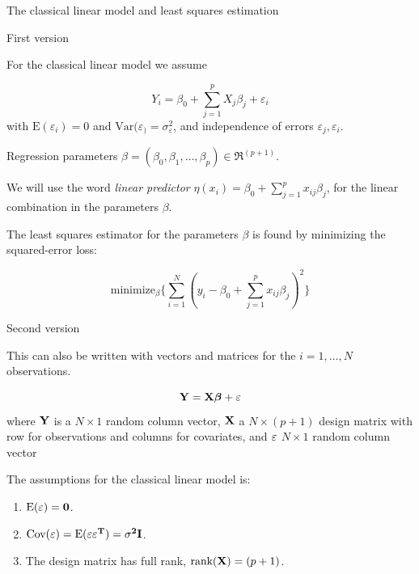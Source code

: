 \documentclass[
  ignorenonframetext,
]{beamer}
\begin{document}
\begin{frame}

\begin{block}{The classical linear model and least squares estimation}

\begin{block}{First version}

For the classical linear model we assume

\[ Y_i=\beta_0+\sum_{j=1}^p X_{j}\beta_j+\varepsilon_i\] with
\(\text{E}(\varepsilon_i)=0\) and
\(\text{Var}(\varepsilon_)=\sigma^2_{\varepsilon}\), and independence of
errors \(\varepsilon_j,\varepsilon_i\).

Regression parameters
\(\beta=(\beta_0,\beta_1,\ldots,\beta_p)\in \Re^{(p+1)}\).

We will use the word \emph{linear predictor}
\(\eta(x_i)=\beta_0+\sum_{j=1}^p x_{ij}\beta_j\), for the linear
combination in the parameters \(\beta\).

The least squares estimator for the parameters \(\beta\) is found by
minimizing the squared-error loss:

\[ \text{minimize}_{\beta} \{ \sum_{i=1}^N (y_i-\beta_0+\sum_{j=1}^p x_{ij}\beta_j)^2\}\]

\end{block}

\end{block}

\end{frame}

\begin{frame}

\begin{block}{Second version}

This can also be written with vectors and matrices for the
\(i=1,\ldots,N\) observations.

\[{\bf Y=X \boldsymbol{\beta}}+{\bf\varepsilon}\] where \({\bf Y}\) is a
\(N \times 1\) random column vector, \({\bf X}\) a \(N \times (p+1)\)
design matrix with row for observations and columns for covariates, and
\({\bf{\varepsilon}}\) \(N \times 1\) random column vector

The assumptions for the classical linear model is:

\begin{enumerate}
\item
  \(\text{E}(\bf{\varepsilon})=\bf{0}\).
\item
  \(\text{Cov}(\bf{\varepsilon})=\text{E}(\bf{\varepsilon}\bf{\varepsilon}^T)=\sigma^2\bf{I}\).
\item
  The design matrix has full rank, \(\text{rank}({\bf X})=(p+1)\).
\end{enumerate}

\end{block}

\end{frame}
\end{document}
